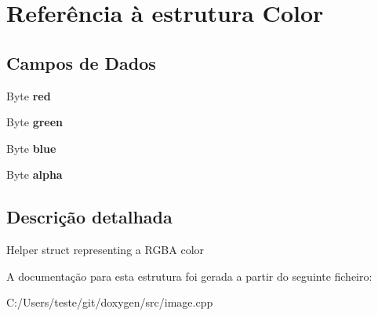 \hypertarget{struct_color}{\section{Referência à estrutura Color}
\label{struct_color}
}
\subsection*{Campos de Dados}
\begin{DoxyCompactItemize}
\item 
\hypertarget{struct_color_a9b2249ae0b3882aaf27e96c396a5bb13}{Byte {\bfseries red}}\label{struct_color_a9b2249ae0b3882aaf27e96c396a5bb13}

\item 
\hypertarget{struct_color_a40093bf40480ad4ae7f43bda1bb6954b}{Byte {\bfseries green}}\label{struct_color_a40093bf40480ad4ae7f43bda1bb6954b}

\item 
\hypertarget{struct_color_a101bb7f248e248bd71231690a6f515ea}{Byte {\bfseries blue}}\label{struct_color_a101bb7f248e248bd71231690a6f515ea}

\item 
\hypertarget{struct_color_a9a0673462c984cab261161ab23456e6e}{Byte {\bfseries alpha}}\label{struct_color_a9a0673462c984cab261161ab23456e6e}

\end{DoxyCompactItemize}


\subsection{Descrição detalhada}
Helper struct representing a R\-G\-B\-A color 

A documentação para esta estrutura foi gerada a partir do seguinte ficheiro\-:\begin{DoxyCompactItemize}
\item 
C\-:/\-Users/teste/git/doxygen/src/image.\-cpp\end{DoxyCompactItemize}
